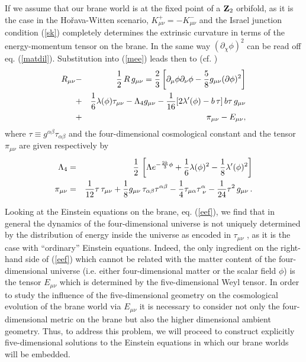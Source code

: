 \documentclass[prd,a4paper,twocolumn,superscriptaddress,nofootinbib,showpacs]{revtex4}
\def\half{{1\over 2}\,}
\begin{document}
If we assume that our brane world is at the fixed point of a ${\bf Z}_{2}$ orbifold, as it is 
the case in the Ho\v{r}ava-Witten scenario, $K_{\mu\nu}^{+}=-K_{\mu\nu}^{-}$ and the Israel 
junction condition (\ref{sk}) completely determines the extrinsic curvature in terms of the energy-momentum 
tensor on the brane. In the same way $(\partial_{\chi}\phi)^2$ can be read
off eq. (\ref{matdil}).  Substitution 
into (\ref{mee}) leads then to (cf. \cite{mw})
\begin{eqnarray}
R_{\mu\nu}&-&\half R\,g_{\mu\nu}={2\over 3}\left[\partial_{\mu}\phi\partial_{\nu}\phi-{5\over 8}g_{\mu\nu}
(\partial\phi)^2\right]\nonumber \\
&+&{1\over 6}\lambda(\phi)\tau_{\mu\nu}- \Lambda_{4}g_{\mu\nu} -{1\over 16}[2\lambda'(\phi)
-b\,\tau]\,b\tau\,g_{\mu\nu}\nonumber \\
&+&\pi_{\mu\nu}-E_{\mu\nu},
\label{eef}
\end{eqnarray}
where $\tau\equiv g^{\alpha\beta}\tau_{\alpha\beta}$ and 
the four-dimensional cosmological constant and the tensor $\pi_{\mu\nu}$ are given respectively
by
\begin{eqnarray}
\Lambda_{4}&=& \half\left[\Lambda e^{-{2k\over 3}\phi}+{1\over 6}\lambda(\phi)^2-{1\over 8}\lambda'(\phi)^2\right]
\label{cc} \\
\pi_{\mu\nu} &=& {1\over 12}\tau\,\tau_{\mu\nu}+{1\over 8}g_{\mu\nu}\,\tau_{\alpha\beta}\tau^{\alpha\beta}
-{1\over 4}\tau_{\mu\alpha}\tau^{\alpha}_{\,\,\nu} - {1\over 24}\tau^{2}\,g_{\mu\nu}\,.
\nonumber 
\end{eqnarray}

Looking at the Einstein equations on the brane, eq. (\ref{eef}), we find that in general the dynamics of the
four-dimensional universe is not uniquely determined by the distribution of energy inside the 
universe as encoded in $\tau_{\mu\nu}$ \cite{mss,mw}, as it is the case with ``ordinary'' Einstein equations. 
Indeed, the only ingredient on the right-hand side of (\ref{eef}) which cannot be related with the matter content of the 
four-dimensional universe (i.e. either four-dimensional matter or the scalar field $\phi$) is the tensor $E_{\mu\nu}$
which is determined by the five-dimensional Weyl tensor. In order to study the influence of the five-dimensional
geometry on the cosmological evolution of the brane world via 
$E_{\mu\nu}$ it is necessary to consider not only 
the four-dimensional metric on the brane but also the higher dimensional ambient geometry. Thus, 
to address this problem, we will proceed to construct explicitly five-dimensional solutions to the Einstein equations 
in which our brane worlds will be embedded.
\end{document}
